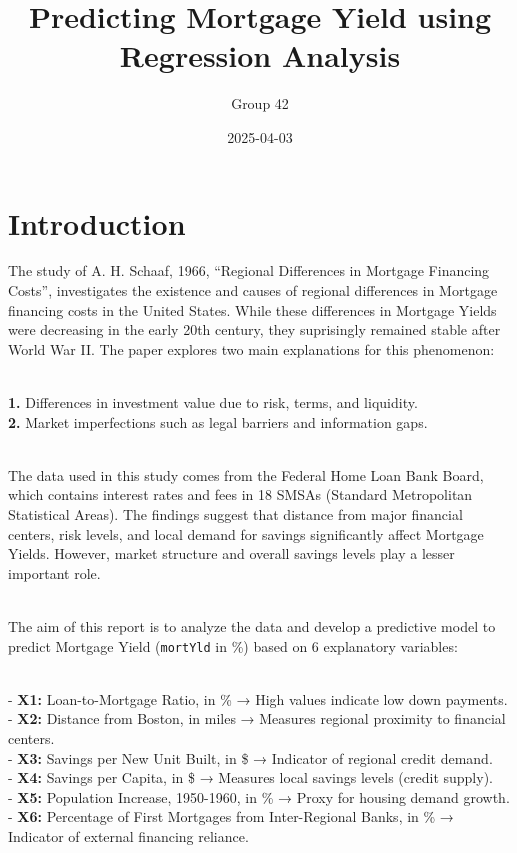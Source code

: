 \documentclass[
  11pt,
]{article}
\title{Predicting Mortgage Yield using Regression Analysis}
\author{Group 42}
\date{2025-04-03}
\begin{document}
\maketitle

\section{Introduction}\label{introduction}

The study of A. H. Schaaf, 1966, ``Regional Differences in Mortgage
Financing Costs'', investigates the existence and causes of regional
differences in Mortgage financing costs in the United States. While
these differences in Mortgage Yields were decreasing in the early 20th
century, they suprisingly remained stable after World War II. The paper
explores two main explanations for this phenomenon:\\
\strut \\
\textbf{1.} Differences in investment value due to risk, terms, and
liquidity.\\
\textbf{2.} Market imperfections such as legal barriers and information
gaps.\\
\strut \\
The data used in this study comes from the Federal Home Loan Bank Board,
which contains interest rates and fees in 18 SMSAs (Standard
Metropolitan Statistical Areas). The findings suggest that distance from
major financial centers, risk levels, and local demand for savings
significantly affect Mortgage Yields. However, market structure and
overall savings levels play a lesser important role.\\
\strut \\
The aim of this report is to analyze the data and develop a predictive
model to predict Mortgage Yield (\texttt{mortYld} in \%) based on 6
explanatory variables:\\
\strut \\
- \textbf{X1:} Loan-to-Mortgage Ratio, in \% → High values indicate low
down payments.\\
- \textbf{X2:} Distance from Boston, in miles → Measures regional
proximity to financial centers.\\
- \textbf{X3:} Savings per New Unit Built, in \$ → Indicator of regional
credit demand.\\
- \textbf{X4:} Savings per Capita, in \$ → Measures local savings levels
(credit supply).\\
- \textbf{X5:} Population Increase, 1950-1960, in \% → Proxy for housing
demand growth.\\
- \textbf{X6:} Percentage of First Mortgages from Inter-Regional Banks,
in \% → Indicator of external financing reliance.
\end{document}
